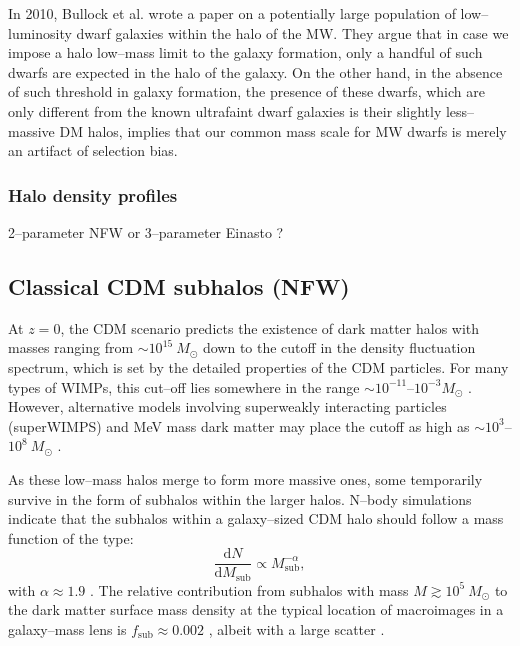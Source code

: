 \documentclass[paper=a4, fontsize=11pt]{scrartcl} %
\numberwithin{equation}{section} %
\numberwithin{figure}{section} %
\numberwithin{table}{section} %
\begin{document}
In 2010, Bullock et al. wrote a paper on a potentially large population of low--luminosity dwarf galaxies within the halo of the MW. They argue that in case we impose a halo low--mass limit to the galaxy formation, only a handful of such dwarfs are expected in the halo of the galaxy. On the other hand, in the absence of such threshold in galaxy formation, the presence of these dwarfs, which are only different from the known ultrafaint dwarf galaxies is their slightly less--massive DM halos, implies that our common mass scale for MW dwarfs is merely an artifact of selection bias. 
 

\subsubsection*{Halo density profiles}
2--parameter NFW or 3--parameter Einasto ?
\subsection{Classical CDM subhalos (NFW)}
\label{NFW}
At $z=0$, the CDM scenario predicts the existence of dark matter halos with masses ranging from $\sim 10^{15}\ M_\odot$ down to the cutoff in the density fluctuation spectrum, which is set by the detailed properties of the CDM particles. For many types of WIMPs, this cut--off lies somewhere in the range $\sim 10^{-11}$--$10^{-3} M_\odot$ \cite{Bringmann}. However, alternative models involving superweakly interacting particles (superWIMPS) and MeV mass dark matter may place the cutoff as high as $\sim 10^3$--$10^8 \ M_\odot$ \cite{Hisano et al.,Hooper et al.}. 

As these low--mass halos merge to form more massive ones, some temporarily survive in the form of subhalos within the larger halos. N--body simulations indicate that the subhalos within a galaxy--sized CDM halo should follow a mass function of the type:
\begin{equation}
\frac{\mathrm{d}N}{\mathrm{d}M_\mathrm{sub}}\propto M_\mathrm{sub}^{-\alpha},
\label{subhalo mass function}
\end{equation}
with $\alpha\approx 1.9$ \cite{Springel et al.,Gao et al.}. The relative contribution from subhalos with mass $M\gtrsim 10^5\ M_\odot$ to the dark matter surface mass density at the typical location of macroimages in a galaxy--mass lens is $f_\mathrm{sub}\approx 0.002$ \cite{Xu et al. b}, albeit with a large scatter \cite{Chen et al.}. 
\end{document}
